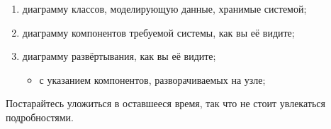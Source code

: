 \documentclass[a5paper]{article}
\begin{document}
\begin{enumerate}
    \item диаграмму классов, моделирующую данные, хранимые системой;
    \item диаграмму компонентов требуемой системы, как вы её видите;
    \item диаграмму развёртывания, как вы её видите;
    \begin{itemize}
        \item с указанием компонентов, разворачиваемых на узле;
    \end{itemize}
\end{enumerate}

Постарайтесь уложиться в оставшееся время, так что не стоит увлекаться подробностями.
\end{document}
